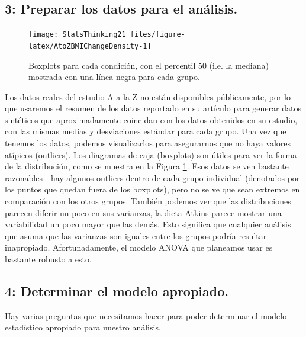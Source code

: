 \documentclass[
  12pt,
]{book}
\begin{document}
\hypertarget{preparar-los-datos-para-el-anuxe1lisis.}{%
\subsection{3: Preparar los datos para el análisis.}\label{preparar-los-datos-para-el-anuxe1lisis.}}

\begin{figure}
\texttt{[image: StatsThinking21\_files/figure-latex/AtoZBMIChangeDensity-1]} \caption{Boxplots para cada condición, con el percentil 50 (i.e. la mediana) mostrada con una línea negra para cada grupo.}\label{fig:AtoZBMIChangeDensity}
\end{figure}

Los datos reales del estudio A a la Z no están disponibles públicamente, por lo que usaremos el resumen de los datos reportado en su artículo para generar datos sintéticos que aproximadamente coincidan con los datos obtenidos en su estudio, con las mismas medias y desviaciones estándar para cada grupo. Una vez que tenemos los datos, podemos visualizarlos para asegurarnos que no haya valores atípicos (outliers). Los diagramas de caja (boxplots) son útiles para ver la forma de la distribución, como se muestra en la Figura \ref{fig:AtoZBMIChangeDensity}. Esos datos se ven bastante razonables - hay algunos outliers dentro de cada grupo individual (denotados por los puntos que quedan fuera de los boxplots), pero no se ve que sean extremos en comparación con los otros grupos. También podemos ver que las distribuciones parecen diferir un poco en sus varianzas, la dieta Atkins parece mostrar una variabilidad un poco mayor que las demás. Esto significa que cualquier análisis que asuma que las varianzas son iguales entre los grupos podría resultar inapropiado. Afortunadamente, el modelo ANOVA que planeamos usar es bastante robusto a esto.

\hypertarget{determinar-el-modelo-apropiado.}{%
\subsection{4: Determinar el modelo apropiado.}\label{determinar-el-modelo-apropiado.}}

Hay varias preguntas que necesitamos hacer para poder determinar el modelo estadístico apropiado para nuestro análisis.
\end{document}
